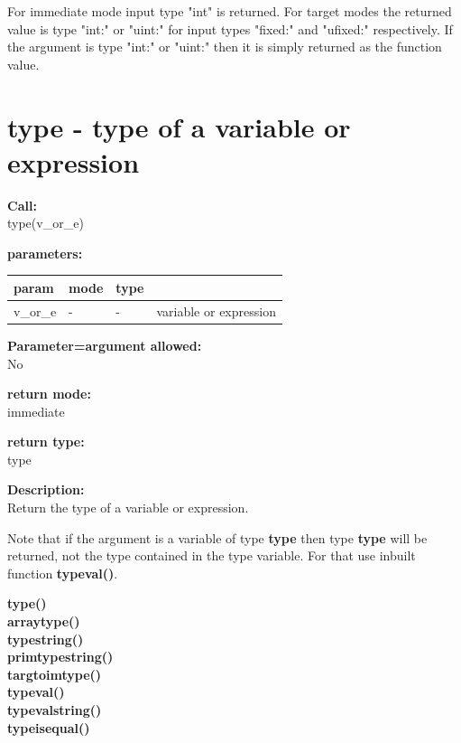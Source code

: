         For immediate mode input type "int" is returned. For target modes
        the returned value is type "int:" or "uint:" for input types
        "fixed:" and "ufixed:" respectively. If the argument is type "int:"
        or "uint:" then it is simply returned as the function value.


    \section{type - type of a variable or expression}\label{sec:iftype}
        
        {\bf Call:} \\
        type(v\_or\_e)
        
        {\bf parameters:} \\
        \begin{tabular}{| l | l | l | l |}
        \hline
        param  & mode & type & \\
        \hline \hline
        v\_or\_e & - &  -  & variable or expression \\ \hline
        \end{tabular}
        
        {\bf Parameter=argument allowed:} \\
        No
        
        {\bf return mode:} \\
        immediate

        {\bf return type:} \\
        type
        
        {\bf Description:} \\
        Return the type of a variable or expression.
        
        Note that if the argument is a variable of type {\bf type} then
        type {\bf type} will be returned, not the type contained in the type
        variable. For that use inbuilt function {\bf typeval()}.
        
        
        {\bf type()}  \\
        {\bf arraytype()}  \\
        {\bf typestring()}  \\
        {\bf primtypestring()}  \\
        {\bf targtoimtype()}  \\
        {\bf typeval()}  \\
        {\bf typevalstring()}  \\
        {\bf typeisequal()}  \\


